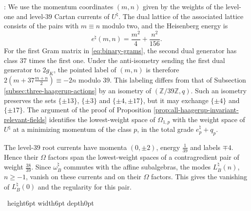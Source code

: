 \documentclass[leqno]{article}
\newcommand{\Z}{\ensuremath{\mathbb{Z}}}
\renewcommand{\geq}{\ensuremath{\geqslant}}
\newcommand{\qed}{\hfill \vrule height6pt  width6pt depth0pt}
\newenvironment{proof}[1][]{\noindent {\it Proof #1} : }{\hbox{~}\qed
\smallskip
}
\numberwithin{equation}{section}
\begin{document}
\begin{proof}
We use the momentum coordinates $(m,n)$ given by the weights of the level-one and level-$39$ Cartan currents of $U^\natural$. The dual lattice of the associated lattice consists of the pairs with $m \equiv n$ modulo two, and the Heisenberg energy is
\[
e^\natural(m,n) = \frac{m^2}{4}+\frac{n^2}{156}.
\]
For the first Gram matrix in \eqref{eq:binary-grams}, the second dual generator has class $37$ times the first one. Under the anti-isometry sending the first dual generator to $2g_K$, the pointed label of $(m,n)$ is therefore $2(m+37\frac{m+n}{2}) \equiv -2n$ modulo $39$. This labeling differs from that of Subsection \ref{subsec:three-haagerup-actions} by an isometry of $(\Z/39\Z,q)$. Such an isometry preserves the sets $\{\pm13\}$, $\{\pm3\}$ and $\{\pm4,\pm17\}$, but it may exchange $\{\pm4\}$ and $\{\pm17\}$. The argument of the proof of Proposition \ref{prop:all-haagerup-invariant-relevant-fields} identifies the lowest-weight space of $\Omega_{1,p}$ with the weight space of $U^\natural$ at a minimizing momentum of the class $p$, in the total grade $e_p^\natural+q_p$.

The level-$39$ root currents have momenta $(0,\pm2)$, energy $\frac1{39}$ and labels $\mp4$. Hence their $\Omega$ factors span the lowest-weight spaces of a contragredient pair of weight $\frac{38}{39}$. Since $\omega_B^\natural$ commutes with the affine subalgebras, the modes $L_B^\natural(n)$, $n \geq -1$, vanish on these currents and on their $\Omega$ factors. This gives the vanishing of $L_B^\natural(0)$ and the regularity for this pair.


\end{proof}
\end{document}
